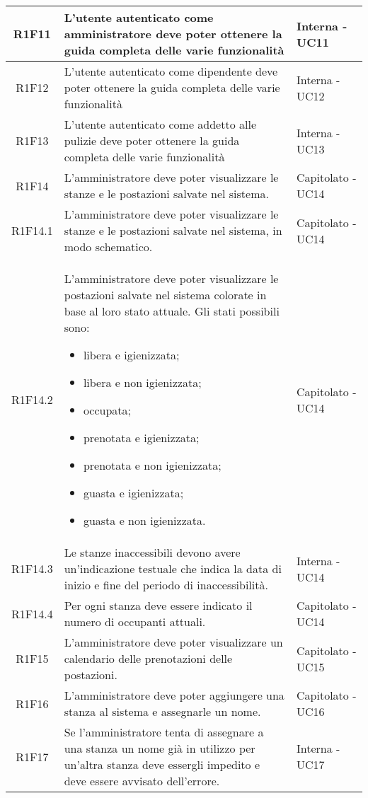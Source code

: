 \begin{center}
\begin{longtable}{|c|p{10cm}|p{4cm}|}
		\hline
		R1F11	&	L'utente autenticato come amministratore deve poter ottenere la guida completa delle varie funzionalità& Interna - UC11	\\
		\hline
		R1F12	&	L'utente autenticato come dipendente deve poter ottenere la guida completa delle varie funzionalità& Interna - UC12	\\
		\hline
		R1F13	&	L'utente autenticato come addetto alle pulizie deve poter ottenere la guida completa delle varie funzionalità& Interna - UC13	\\
		\hline
		R1F14&L'amministratore deve poter visualizzare le stanze e le postazioni salvate nel sistema.& Capitolato - UC14	\\
		\hline
		R1F14.1&L'amministratore deve poter visualizzare le stanze e le postazioni salvate nel sistema, in modo schematico.& Capitolato - UC14	\\
		\hline
		R1F14.2&L'amministratore deve poter visualizzare le postazioni salvate nel sistema colorate in base al loro stato attuale. Gli stati possibili sono:
		\begin{itemize}
			\item libera e igienizzata;
			\item libera e non igienizzata;
			\item occupata;
			\item prenotata e igienizzata;
			\item prenotata e non igienizzata;
			\item guasta e igienizzata;
			\item guasta e non igienizzata.
		\end{itemize}
		& Capitolato - UC14	\\
		\hline
		R1F14.3&Le stanze inaccessibili devono avere un'indicazione testuale che indica la data di inizio e fine del periodo di inaccessibilità. & Interna - UC14	\\
		\hline
		R1F14.4&Per ogni stanza deve essere indicato il numero di occupanti attuali.	& Capitolato - UC14	\\
		\hline
		R1F15&L'amministratore deve poter visualizzare un calendario delle prenotazioni delle postazioni.	& Capitolato - UC15	\\
		\hline
		R1F16&L'amministratore deve poter aggiungere una stanza al sistema e assegnarle un nome.	& Capitolato - UC16	\\
		\hline
		R1F17 & Se l'amministratore tenta di assegnare a una stanza un nome già in utilizzo per un'altra stanza deve essergli impedito e deve essere avvisato dell'errore. & Interna - UC17 \\

\end{longtable}
\end{center}
